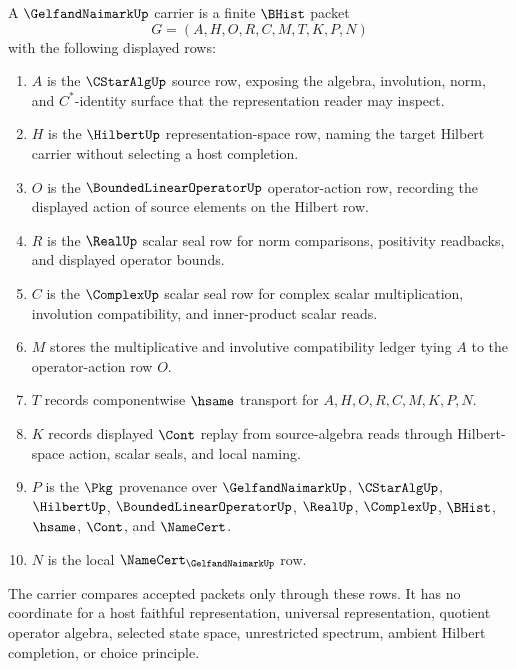 \begin{definition}
\label{def:gelfand-naimark-carrier}
A $\GelfandNaimarkUp$ carrier is a finite $\BHist$ packet
$$
G=(A,H,O,R,C,M,T,K,P,N)
$$
with the following displayed rows:
\begin{enumerate}
\item $A$ is the $\CStarAlgUp$ source row, exposing the algebra, involution, norm, and $C^*$-identity surface that the representation reader may inspect.
\item $H$ is the $\HilbertUp$ representation-space row, naming the target Hilbert carrier without selecting a host completion.
\item $O$ is the $\BoundedLinearOperatorUp$ operator-action row, recording the displayed action of source elements on the Hilbert row.
\item $R$ is the $\RealUp$ scalar seal row for norm comparisons, positivity readbacks, and displayed operator bounds.
\item $C$ is the $\ComplexUp$ scalar seal row for complex scalar multiplication, involution compatibility, and inner-product scalar reads.
\item $M$ stores the multiplicative and involutive compatibility ledger tying $A$ to the operator-action row $O$.
\item $T$ records componentwise $\hsame$ transport for $A,H,O,R,C,M,K,P,N$.
\item $K$ records displayed $\Cont$ replay from source-algebra reads through Hilbert-space action, scalar seals, and local naming.
\item $P$ is the $\Pkg$ provenance over $\GelfandNaimarkUp$, $\CStarAlgUp$, $\HilbertUp$, $\BoundedLinearOperatorUp$, $\RealUp$, $\ComplexUp$, $\BHist$, $\hsame$, $\Cont$, and $\NameCert$.
\item $N$ is the local $\NameCert_{\GelfandNaimarkUp}$ row.
\end{enumerate}
The carrier compares accepted packets only through these rows. It has no coordinate for a host faithful representation, universal representation, quotient operator algebra, selected state space, unrestricted spectrum, ambient Hilbert completion, or choice principle.
\end{definition}

